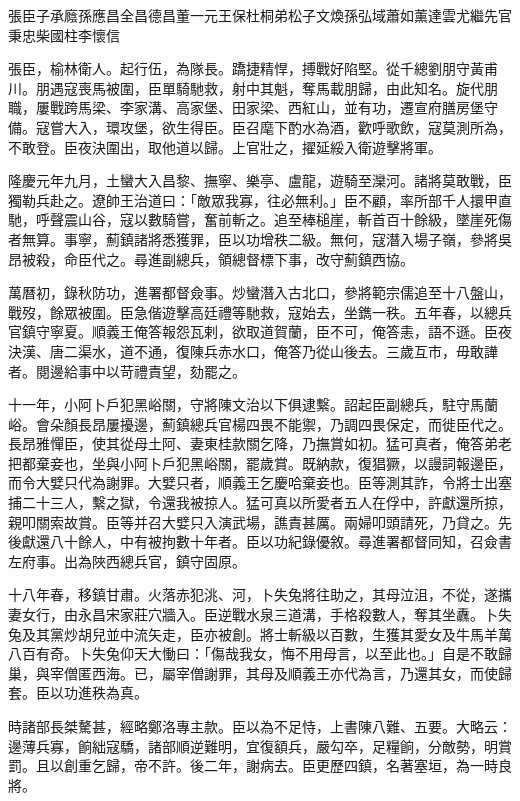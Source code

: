 
\begin{pinyinscope}
張臣子承廕孫應昌全昌德昌董一元王保杜桐弟松子文煥孫弘域蕭如薰達雲尤繼先官秉忠柴國柱李懷信

張臣，榆林衛人。起行伍，為隊長。蹻捷精悍，搏戰好陷堅。從千總劉朋守黃甫川。朋遇寇喪馬被圍，臣單騎馳救，射中其魁，奪馬載朋歸，由此知名。旋代朋職，屢戰跨馬梁、李家溝、高家堡、田家梁、西紅山，並有功，遷宣府膳房堡守備。寇嘗大入，環攻堡，欲生得臣。臣召麾下酌水為酒，歡呼歌飲，寇莫測所為，不敢登。臣夜決圍出，取他道以歸。上官壯之，擢延綏入衛遊擊將軍。

隆慶元年九月，土蠻大入昌黎、撫寧、樂亭、盧龍，遊騎至灤河。諸將莫敢戰，臣獨勒兵赴之。遼帥王治道曰：「敵眾我寡，往必無利。」臣不顧，率所部千人擐甲直馳，呼聲震山谷，寇以數騎嘗，奮前斬之。追至棒槌崖，斬首百十餘級，墜崖死傷者無算。事寧，薊鎮諸將悉獲罪，臣以功增秩二級。無何，寇潛入場子嶺，參將吳昂被殺，命臣代之。尋進副總兵，領總督標下事，改守薊鎮西協。

萬曆初，錄秋防功，進署都督僉事。炒蠻潛入古北口，參將範宗儒追至十八盤山，戰歿，餘眾被圍。臣急偕遊擊高廷禮等馳救，寇始去，坐鐫一秩。五年春，以總兵官鎮守寧夏。順義王俺答報怨瓦剌，欲取道賀蘭，臣不可，俺答恚，語不遜。臣夜決漢、唐二渠水，道不通，復陳兵赤水口，俺答乃從山後去。三歲互市，毋敢譁者。閱邊給事中以苛禮責望，劾罷之。

十一年，小阿卜戶犯黑峪關，守將陳文治以下俱逮繫。詔起臣副總兵，駐守馬蘭峪。會朵顏長昂屢擾邊，薊鎮總兵官楊四畏不能禦，乃調四畏保定，而徙臣代之。長昂雅憚臣，使其從母土阿、妻東桂款關乞降，乃撫賞如初。猛可真者，俺答弟老把都棄妾也，坐與小阿卜戶犯黑峪關，罷歲賞。既納款，復猖獗，以謾詞報邊臣，而令大嬖只代為謝罪。大嬖只者，順義王乞慶哈棄妾也。臣等測其詐，令將士出塞捕二十三人，繫之獄，令還我被掠人。猛可真以所愛者五人在俘中，許獻還所掠，親叩關索故賞。臣等并召大嬖只入演武場，譙責甚厲。兩婦叩頭請死，乃貸之。先後獻還八十餘人，中有被拘數十年者。臣以功紀錄優敘。尋進署都督同知，召僉書左府事。出為陜西總兵官，鎮守固原。

十八年春，移鎮甘肅。火落赤犯洮、河，卜失兔將往助之，其母泣沮，不從，遂攜妻女行，由永昌宋家莊穴牆入。臣逆戰水泉三道溝，手格殺數人，奪其坐纛。卜失兔及其黨炒胡兒並中流矢走，臣亦被創。將士斬級以百數，生獲其愛女及牛馬羊萬八百有奇。卜失兔仰天大慟曰：「傷哉我女，悔不用母言，以至此也。」自是不敢歸巢，與宰僧匿西海。已，屬宰僧謝罪，其母及順義王亦代為言，乃還其女，而使歸套。臣以功進秩為真。

時諸部長桀驁甚，經略鄭洛專主款。臣以為不足恃，上書陳八難、五要。大略云：邊薄兵寡，餉絀寇驕，諸部順逆難明，宜復額兵，嚴勾卒，足糧餉，分敵勢，明賞罰。且以創重乞歸，帝不許。後二年，謝病去。臣更歷四鎮，名著塞垣，為一時良將。


\end{pinyinscope}
